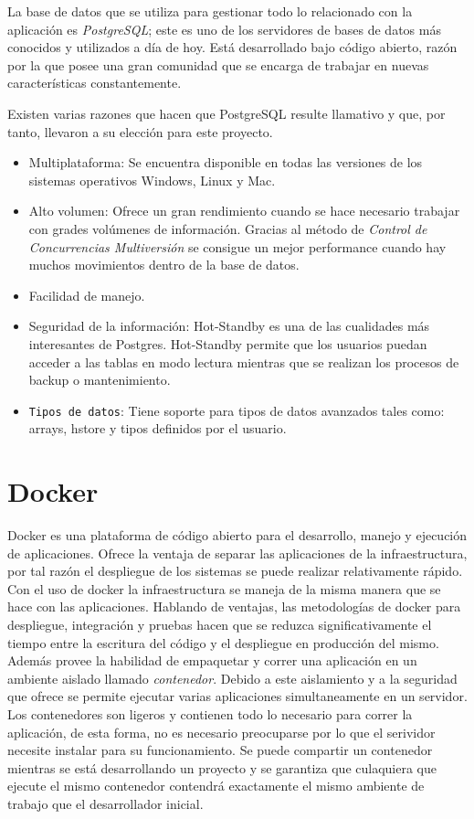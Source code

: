 La base de datos que se utiliza para gestionar todo lo relacionado con la aplicación es \textit{PostgreSQL}; este es uno de los servidores de bases de datos más conocidos y utilizados a día de hoy. Está desarrollado bajo código abierto, razón por la que posee una gran comunidad que se encarga de trabajar en nuevas características constantemente. 

Existen varias razones que hacen que PostgreSQL resulte llamativo y que, por tanto, llevaron a su elección para este proyecto.
\begin{itemize}
	\item Multiplataforma: Se encuentra disponible en todas las versiones de los sistemas operativos Windows, Linux y Mac.
	\item Alto volumen: Ofrece un gran rendimiento cuando se hace necesario trabajar con grades volúmenes de información. Gracias al método de \textit{Control de Concurrencias Multiversión} se consigue un mejor performance cuando hay muchos movimientos dentro de la base de datos.
	\item Facilidad de manejo.
	\item Seguridad de la información: Hot-Standby es una de las cualidades más interesantes de Postgres. Hot-Standby permite que los usuarios puedan acceder a las tablas en modo lectura mientras que se realizan los procesos de backup o mantenimiento.
	\item \texttt{Tipos de datos}: Tiene soporte para tipos de datos avanzados tales como: arrays, hstore y tipos definidos por el usuario.
\end{itemize}

\section{Docker} 


Docker es una plataforma de código abierto para el desarrollo, manejo y ejecución de aplicaciones. Ofrece la ventaja de separar las aplicaciones de la infraestructura, por tal razón el despliegue de los sistemas se puede realizar relativamente rápido. Con el uso de docker  la infraestructura se maneja de la misma manera que se hace con las aplicaciones. Hablando de ventajas, las metodologías de docker para despliegue, integración y pruebas hacen que se reduzca significativamente el tiempo entre la escritura del código y el despliegue en producción del mismo. Además provee la habilidad de empaquetar y correr una aplicación en un ambiente aislado llamado \textit{contenedor}. Debido a este aislamiento y a la seguridad que ofrece se permite ejecutar varias aplicaciones simultaneamente en un servidor. Los contenedores son ligeros y contienen todo lo necesario para correr la aplicación, de esta forma, no es necesario preocuparse por lo que el serividor necesite instalar para su funcionamiento. Se puede compartir un contenedor mientras se está desarrollando  un proyecto y se garantiza que culaquiera que ejecute el mismo contenedor contendrá exactamente el mismo ambiente de trabajo que el desarrollador inicial.\cite{docker_dfn}

